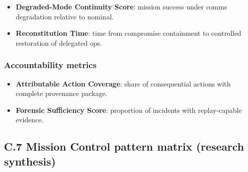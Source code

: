 \documentclass[
]{article}
\providecommand{\tightlist}{%
  \setlength{\itemsep}{0pt}\setlength{\parskip}{0pt}}
\begin{document}
\begin{itemize}
\tightlist
\item
  \textbf{Degraded-Mode Continuity Score}: mission success under comms
  degradation relative to nominal.
\item
  \textbf{Reconstitution Time}: time from compromise containment to
  controlled restoration of delegated ops.
\end{itemize}

\hypertarget{accountability-metrics}{%
\subsubsection{Accountability metrics}\label{accountability-metrics}}

\begin{itemize}
\tightlist
\item
  \textbf{Attributable Action Coverage}: share of consequential actions
  with complete provenance package.
\item
  \textbf{Forensic Sufficiency Score}: proportion of incidents with
  replay-capable evidence.
\end{itemize}

\hypertarget{c.7-mission-control-pattern-matrix-research-synthesis}{%
\subsection{C.7 Mission Control pattern matrix (research
synthesis)}\label{c.7-mission-control-pattern-matrix-research-synthesis}}
\end{document}
